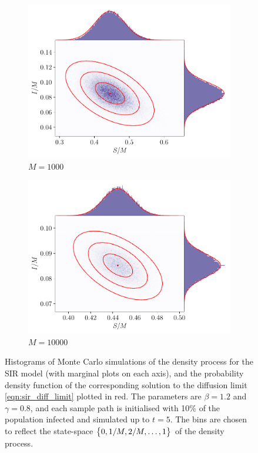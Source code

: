 \begin{figure}
\begin{center}
\begin{subfigure}{0.49\textwidth}
			\includegraphics[width=\textwidth]{chp07_outlook/figures/sir/sir_pairwise_1000}
			\caption{\(M = 1000\)}
			\label{fig:sir_gauss_rels_3}
		\end{subfigure}\begin{subfigure}{0.49\textwidth}
			\includegraphics[width=\textwidth]{chp07_outlook/figures/sir/sir_pairwise_10000}
			\caption{\(M = 10000\)}
			\label{fig:sir_gauss_rels_4}
		\end{subfigure}
		\caption{Histograms of Monte Carlo simulations of the density process for the SIR model (with marginal plots on each axis), and the probability density function of the corresponding solution to the diffusion limit \cref{eqn:sir_diff_limit} plotted in red.
			The parameters are \(\beta = 1.2\) and \(\gamma = 0.8\), and each sample path is initialised with 10\% of the population infected and simulated up to \(t = 5\).
			The bins are chosen to reflect the state-space \(\set{0, 1/M, 2/M, \dotsc, 1}\) of the density process.}
		\label{fig:sir_gauss_rels}
	\end{center}
\end{figure}

